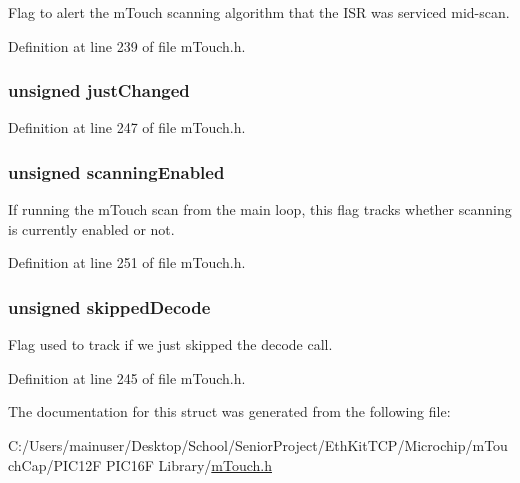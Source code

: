 Flag to alert the m\+Touch scanning algorithm that the I\+S\+R was serviced mid-\/scan. 



Definition at line 239 of file m\+Touch.\+h.

\hypertarget{structm_touch___state_abae066f8affc6afd4e968ed87dc1073f}{}
\subsubsection[{just\+Changed}]{\setlength{\rightskip}{0pt plus 5cm}unsigned just\+Changed}\label{structm_touch___state_abae066f8affc6afd4e968ed87dc1073f}


Definition at line 247 of file m\+Touch.\+h.

\hypertarget{structm_touch___state_a0e6f752c8d598d33da2440d70b8acd76}{}
\subsubsection[{scanning\+Enabled}]{\setlength{\rightskip}{0pt plus 5cm}unsigned scanning\+Enabled}\label{structm_touch___state_a0e6f752c8d598d33da2440d70b8acd76}


If running the m\+Touch scan from the main loop, this flag tracks whether scanning is currently enabled or not. 



Definition at line 251 of file m\+Touch.\+h.

\hypertarget{structm_touch___state_a5bc7c6dc7f7d0fb027257c8911a0deba}{}
\subsubsection[{skipped\+Decode}]{\setlength{\rightskip}{0pt plus 5cm}unsigned skipped\+Decode}\label{structm_touch___state_a5bc7c6dc7f7d0fb027257c8911a0deba}


Flag used to track if we just skipped the decode call. 



Definition at line 245 of file m\+Touch.\+h.



The documentation for this struct was generated from the following file\+:\begin{DoxyCompactItemize}
\item 
C\+:/\+Users/mainuser/\+Desktop/\+School/\+Senior\+Project/\+Eth\+Kit\+T\+C\+P/\+Microchip/m\+Touch\+Cap/\+P\+I\+C12\+F P\+I\+C16\+F Library/\hyperlink{m_touch_cap_2_p_i_c12_f_01_p_i_c16_f_01_library_2m_touch_8h}{m\+Touch.\+h}\end{DoxyCompactItemize}
